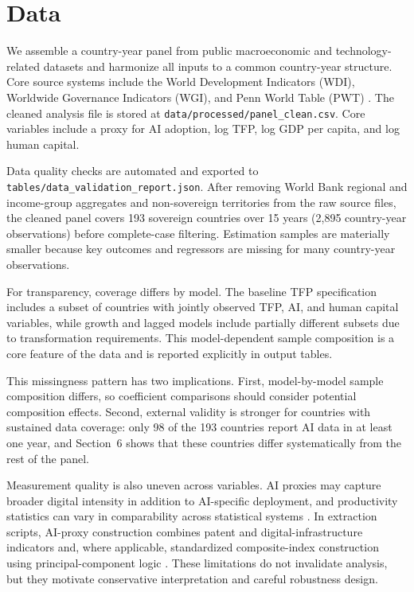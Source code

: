 \section{Data}

We assemble a country-year panel from public macroeconomic and technology-related datasets and harmonize all inputs to a common country-year structure. Core source systems include the World Development Indicators (WDI), Worldwide Governance Indicators (WGI), and Penn World Table (PWT) \cite{worldbankWDI2024,kaufmannKraayMastruzzi2010,feenstraInklaarTimmer2015}. The cleaned analysis file is stored at \texttt{data/processed/panel\_clean.csv}. Core variables include a proxy for AI adoption, log TFP, log GDP per capita, and log human capital.

Data quality checks are automated and exported to \texttt{tables/data\_validation\_report.json}. After removing World Bank regional and income-group aggregates and non-sovereign territories from the raw source files, the cleaned panel covers 193 sovereign countries over 15 years (2,895 country-year observations) before complete-case filtering. Estimation samples are materially smaller because key outcomes and regressors are missing for many country-year observations.

For transparency, coverage differs by model. The baseline TFP specification includes a subset of countries with jointly observed TFP, AI, and human capital variables, while growth and lagged models include partially different subsets due to transformation requirements. This model-dependent sample composition is a core feature of the data and is reported explicitly in output tables.

This missingness pattern has two implications. First, model-by-model sample composition differs, so coefficient comparisons should consider potential composition effects. Second, external validity is stronger for countries with sustained data coverage: only 98 of the 193 countries report AI data in at least one year, and Section~6 shows that these countries differ systematically from the rest of the panel.

Measurement quality is also uneven across variables. AI proxies may capture broader digital intensity in addition to AI-specific deployment, and productivity statistics can vary in comparability across statistical systems \cite{worldbank2021wdr}. In extraction scripts, AI-proxy construction combines patent and digital-infrastructure indicators and, where applicable, standardized composite-index construction using principal-component logic \cite{worldbankWDI2024,jolliffeCadima2016}. These limitations do not invalidate analysis, but they motivate conservative interpretation and careful robustness design.
